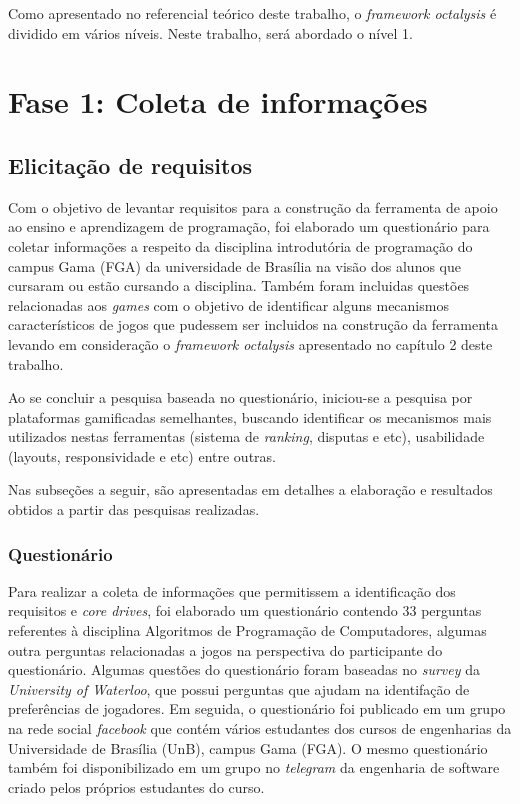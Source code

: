 Como apresentado no referencial teórico deste trabalho, o \textit{framework octalysis} é dividido em vários níveis. Neste
trabalho, será abordado o nível 1. 

\section{Fase 1: Coleta de informações }

\subsection{Elicitação de requisitos}
Com o objetivo de levantar requisitos para a construção da ferramenta de apoio ao ensino e aprendizagem de 
programação, foi elaborado um questionário para coletar informações a respeito da disciplina introdutória de programação 
do campus Gama (FGA) da universidade de Brasília na visão dos alunos que cursaram ou estão cursando a disciplina. Também 
foram incluidas  questões relacionadas aos \textit{games} com o objetivo de identificar alguns mecanismos característicos
de jogos que pudessem ser incluidos na construção da ferramenta levando em consideração o  \textit{framework octalysis}
apresentado no capítulo 2 deste trabalho.

Ao se concluir a pesquisa baseada no questionário, iniciou-se a pesquisa por plataformas gamificadas semelhantes, buscando
identificar os mecanismos mais utilizados nestas ferramentas (sistema de \textit{ranking}, disputas e etc), usabilidade (layouts, responsividade e etc) entre outras.

Nas subseções a seguir, são apresentadas em detalhes a elaboração e resultados obtidos a partir das pesquisas realizadas.

\subsubsection{Questionário}
Para realizar a coleta de informações que permitissem a identificação dos requisitos e \textit{core drives}, foi elaborado um questionário 
contendo 33 perguntas referentes à disciplina Algoritmos de Programação de Computadores, algumas outra perguntas
relacionadas a jogos na perspectiva do participante do questionário. Algumas questões do questionário foram baseadas no \textit{survey}
da \textit{University of Waterloo}, que possui perguntas que ajudam na identifação de preferências de jogadores.
Em seguida, o questionário foi publicado em um grupo na rede social \textit{facebook} que contém
vários estudantes dos cursos de engenharias da Universidade de Brasília (UnB), campus Gama (FGA). O mesmo questionário
também foi disponibilizado em um grupo no \textit{telegram} da engenharia de software criado pelos próprios estudantes do
curso. 

